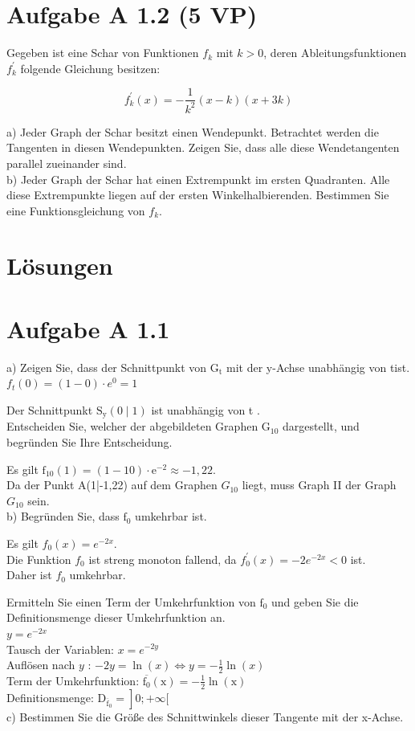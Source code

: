 \documentclass[10pt]{article}
\begin{document}
\section*{Aufgabe A 1.2 (5 VP)}
Gegeben ist eine Schar von Funktionen $f_{k}$ mit $k>0$, deren Ableitungsfunktionen $f_{k}^{\prime}$ folgende Gleichung besitzen:

$$
f_{k}^{\prime}(x)=-\frac{1}{k^{2}}(x-k)(x+3 k)
$$

a) Jeder Graph der Schar besitzt einen Wendepunkt. Betrachtet werden die Tangenten in diesen Wendepunkten. Zeigen Sie, dass alle diese Wendetangenten parallel zueinander sind.\\
b) Jeder Graph der Schar hat einen Extrempunkt im ersten Quadranten. Alle diese Extrempunkte liegen auf der ersten Winkelhalbierenden. Bestimmen Sie eine Funktionsgleichung von $f_{k}$.

\section*{Lösungen}
\section*{Aufgabe A 1.1}
a) Zeigen Sie, dass der Schnittpunkt von $\mathrm{G}_{\mathrm{t}}$ mit der y-Achse unabhängig von tist.\\
$f_{t}(0)=(1-0) \cdot e^{0}=1$

Der Schnittpunkt $\mathrm{S}_{\mathrm{y}}(0 \mid 1)$ ist unabhängig von t .\\
Entscheiden Sie, welcher der abgebildeten Graphen $\mathrm{G}_{10}$ dargestellt, und begründen Sie Ihre Entscheidung.

Es gilt $\mathrm{f}_{10}(1)=(1-10) \cdot \mathrm{e}^{-2} \approx-1,22$.\\
Da der Punkt A(1|-1,22) auf dem Graphen $G_{10}$ liegt, muss Graph II der Graph $G_{10}$ sein.\\
b) Begründen Sie, dass $\mathrm{f}_{0}$ umkehrbar ist.

Es gilt $f_{0}(x)=e^{-2 x}$.\\
Die Funktion $f_{0}$ ist streng monoton fallend, da $f_{0}^{\prime}(x)=-2 e^{-2 x}<0$ ist.\\
Daher ist $f_{0}$ umkehrbar.

Ermitteln Sie einen Term der Umkehrfunktion von $\mathrm{f}_{0}$ und geben Sie die\\
Definitionsmenge dieser Umkehrfunktion an.\\
$y=e^{-2 x}$\\
Tausch der Variablen: $x=e^{-2 y}$\\
Auflösen nach $y$ : $-2 y=\ln (x) \Leftrightarrow y=-\frac{1}{2} \ln (x)$\\
Term der Umkehrfunktion: $\overline{\mathrm{f}_{0}}(\mathrm{x})=-\frac{1}{2} \ln (\mathrm{x})$\\
Definitionsmenge: $\left.\mathrm{D}_{\overline{\mathrm{f}}_{0}}=\right] 0 ;+\infty[$\\
c) Bestimmen Sie die Größe des Schnittwinkels dieser Tangente mit der x-Achse.
\end{document}
